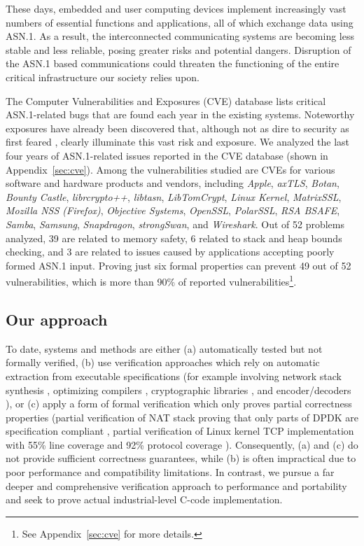 \documentclass[acmsmall,nonacm]{acmart}
\begin{document}
These days, embedded and user computing devices  implement increasingly vast numbers of essential functions and applications, all of which
exchange data using ASN.1. As a result, the interconnected communicating
systems are becoming less stable and less reliable, posing greater risks and
potential dangers. Disruption of the ASN.1 based communications
could threaten the functioning of the entire critical infrastructure our
society relies upon.


The Computer Vulnerabilities and Exposures (CVE) database \cite{CVE}
lists critical ASN.1-related bugs that are found each year in the
existing systems. Noteworthy exposures have already been discovered
\cite{OpenSSLMemoryCorruption} that, although not as dire to security
as first feared \cite{ASN1Flaw}, clearly illuminate this vast risk and
exposure. We analyzed the last four years of ASN.1-related issues
reported in the CVE database (shown in Appendix~\ref{sec:cve}). Among
the vulnerabilities studied are CVEs for various software and hardware
products and vendors, including \textit{Apple}, \textit{axTLS},
\textit{Botan}, \textit{Bounty Castle}, \textit{librcrypto++},
\textit{libtasn}, \textit{LibTomCrypt}, \textit{Linux Kernel},
\textit{MatrixSSL}, \textit{Mozilla NSS (Firefox)}, \textit{Objective
  Systems}, \textit{OpenSSL}, \textit{PolarSSL}, \textit{RSA BSAFE},
\textit{Samba}, \textit{Samsung}, \textit{Snapdragon},
\textit{strongSwan}, and \textit{Wireshark}. Out of 52 problems
analyzed, 39 are related to memory safety, 6 related to stack and heap
bounds checking, and 3 are related to issues caused by applications
accepting poorly formed ASN.1 input. Proving just six formal
properties can prevent 49 out of 52 vulnerabilities, which is more
than 90\% of reported vulnerabilities\footnote{See
  Appendix~\ref{sec:cve} for more details.}.

\subsection{Our approach}
\label{sec:approach}
To date, systems and methods are either (a) automatically tested but not
formally verified, (b) use verification approaches which rely on
automatic extraction from executable specifications (for example
involving network stack synthesis \cite{VNSSforSel4}, optimizing compilers
\cite{CompCert}, cryptographic libraries \cite{HACL}, and
encoder/decoders \cite{Narcissus}), or (c) apply a form of formal
verification which only proves partial correctness properties (partial
verification of NAT stack proving that only parts of DPDK are specification
compliant \cite{NAT}, partial verification of Linux kernel TCP
implementation with 55\% line coverage and 92\% protocol coverage
\cite{NSDI}). Consequently, (a) and (c) do not provide sufficient
correctness guarantees, while (b) is often impractical due to poor
performance and compatibility limitations. In contrast, we pursue a
far deeper and comprehensive verification approach to performance and
portability and seek to prove actual industrial-level C-code
implementation.
\end{document}
